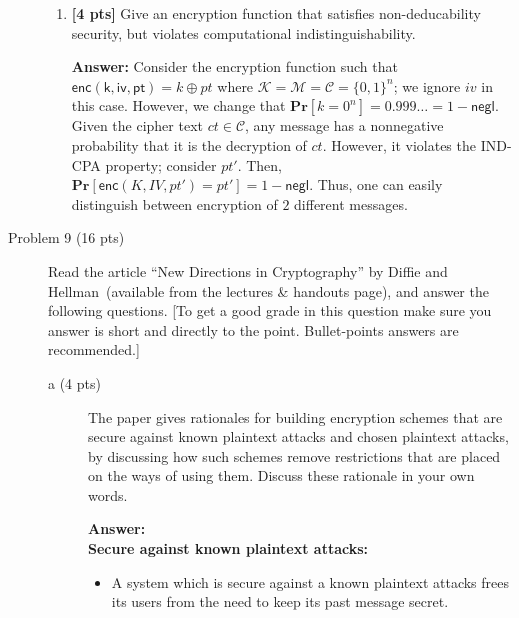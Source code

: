 \documentclass[11pt]{article}
\renewcommand{\Pr}{\ensuremath{\mathbf{Pr}}\xspace}
\newcommand{\ans}[1]{\begin{mdframed}\textbf{Answer: }#1\end{mdframed}}
\begin{document}
\begin{description}
\begin{enumerate}
 \item \textbf{[4 pts]}
Give an encryption function that satisfies  non-deducability security, but violates computational indistinguishability.
\ans{
  Consider the encryption function such that $\mathsf{enc(k,iv,pt)} = k \oplus pt$ where $\mathcal K = \mathcal M = \mathcal C = \{0,1\}^n$; we ignore $iv$ in this case. However, we change that $\Pr[k=0^n]= 0.999\dots = 1- \mathsf{negl}$. Given the cipher text $ct \in \mathcal C$, any message has a nonnegative probability that it is the decryption of $ct$. However, it violates the IND-CPA property; consider $pt'$. Then,  $\Pr[\mathsf{enc}(K,IV,pt') = pt']=1-\mathsf{negl}$. Thus, one can easily distinguish between encryption of $2$ different messages.
}
\end{enumerate}

\item[Problem 9 (16 pts)]  Read the article ``New Directions in
Cryptography'' by Diffie and Hellman~(available from the lectures \& handouts page), and answer the following questions. [To get a good grade in this question make sure you answer is short and directly to the point. Bullet-points answers are recommended.]

\begin{description}

 \item [a (4 pts)]
The paper gives rationales for building encryption schemes that are
secure against known plaintext attacks and chosen plaintext attacks, by
discussing how such schemes remove restrictions that are placed on the
ways of using them.  Discuss these rationale in your own words.
\ans{
\\
  \textbf{Secure against known plaintext attacks:}
  \begin{itemize}
    \item 
    A system which is secure against a known plaintext attacks frees its users from the need to keep its past message secret.


\end{itemize}}
\end{description}
\end{description}
\end{document}
